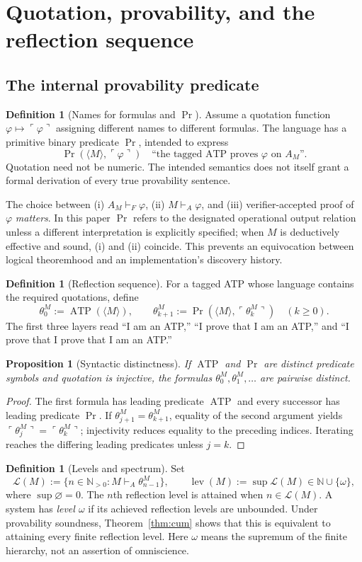 \documentclass[11pt,letterpaper]{article}
\newtheorem{proposition}[theorem]{Proposition}
\theoremstyle{definition}\newtheorem{definition}[theorem]{Definition}\newtheorem{example}[theorem]{Example}\newtheorem{protocol}[theorem]{Protocol}\newtheorem{question}[theorem]{Open Problem}
\theoremstyle{remark}\newtheorem{remark}[theorem]{Remark}
\newcommand{\N}{\mathbb N}\newcommand{\Pset}{\mathcal P}\newcommand{\Con}{\operatorname{Con}}
\newcommand{\lev}{\operatorname{lev}}
\newcommand{\Prov}{\operatorname{Pr}}
\newcommand{\Mtag}{\langle M\rangle}
\newcommand{\Nth}{\N_{>0}}
\newcommand{\qname}[1]{\ulcorner #1\urcorner}
\begin{document}
\section{Quotation, provability, and the reflection sequence}
\subsection{The internal provability predicate}
\begin{definition}[Names for formulas and $\Prov$]
Assume a quotation function $\varphi\mapsto\qname{\varphi}$ assigning different names to different formulas. The language has a primitive binary predicate $\Prov$, intended to express
\[
\Prov(\Mtag,\qname{\varphi})\quad\text{``the tagged ATP proves $\varphi$ on $A_M$''.}
\]
Quotation need not be numeric. The intended semantics does not itself grant a formal derivation of every true provability sentence.
\end{definition}
The choice between (i) $A_M\vdash_F\varphi$, (ii) $M\vdash_A\varphi$, and (iii) verifier-accepted proof of $\varphi$ \emph{matters}. In this paper $\Prov$ refers to the designated operational output relation unless a different interpretation is explicitly specified; when $M$ is deductively effective and sound, (i) and (ii) coincide. This prevents an equivocation between logical theoremhood and an implementation's discovery history.
\begin{definition}[Reflection sequence]
For a tagged ATP whose language contains the required quotations, define
\[
\theta_0^M:=\operatorname{ATP}(\Mtag),\qquad
\theta_{k+1}^M:=\Prov(\Mtag,\qname{\theta_k^M})\quad(k\ge0).
\]
The first three layers read ``I am an ATP,'' ``I prove that I am an ATP,'' and ``I prove that I prove that I am an ATP.''
\end{definition}
\begin{proposition}[Syntactic distinctness]\label{prop:distinct}
If $\operatorname{ATP}$ and $\Prov$ are distinct predicate symbols and quotation is injective, the formulas $\theta_0^M,\theta_1^M,\dots$ are pairwise distinct.
\end{proposition}
\begin{proof}
The first formula has leading predicate $\operatorname{ATP}$ and every successor has leading predicate $\Prov$. If $\theta_{j+1}^M=\theta_{k+1}^M$, equality of the second argument yields $\qname{\theta_j^M}=\qname{\theta_k^M}$; injectivity reduces equality to the preceding indices. Iterating reaches the differing leading predicates unless $j=k$.
\end{proof}
\begin{definition}[Levels and spectrum]
Set
\[
\mathcal L(M):=\{n\in\Nth:M\vdash_A\theta_{n-1}^M\},\qquad
\lev(M):=\sup\mathcal L(M)\in\N\cup\{\omega\},
\]
where $\sup\varnothing=0$. The $n$th reflection level is attained when $n\in\mathcal L(M)$. A system has \emph{level $\omega$} if its achieved reflection levels are unbounded. Under provability soundness, Theorem~\ref{thm:cum} shows that this is equivalent to attaining every finite reflection level. Here $\omega$ means the supremum of the finite hierarchy, not an assertion of omniscience.
\end{definition}
\end{document}
